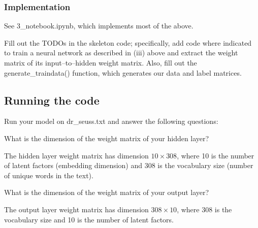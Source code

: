 \subsubsection{Implementation}

See 3_notebook.ipynb, which implements most of the above.

\problem[10]
Fill out the TODOs in the skeleton code; specifically, add code where indicated to train a neural network as described in (iii) above and extract the weight matrix of its input--to--hidden weight matrix. Also, fill out the generate\_traindata() function, which generates our data and label matrices.


\begin{solution}
\end{solution}

\subsection{Running the code}
Run your model on dr_seuss.txt and answer the following questions:

\problem[2]
What is the dimension of the weight matrix of your hidden layer?

\begin{solution}
The hidden layer weight matrix has dimension $10 \times 308$, where 10 is the number of latent factors (embedding dimension) and 308 is the vocabulary size (number of unique words in the text).
\end{solution}

\problem[2]
What is the dimension of the weight matrix of your output layer?
\begin{solution}
The output layer weight matrix has dimension $308 \times 10$, where 308 is the vocabulary size and 10 is the number of latent factors.
\end{solution}

